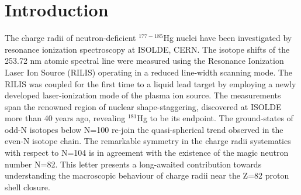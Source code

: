 \section{Introduction}
The charge radii of neutron-deficient $^{177-185}$Hg nuclei have been investigated by resonance ionization spectroscopy at ISOLDE, CERN.  The isotope shifts of the 253.72 nm atomic spectral line were measured using the Resonance Ionization Laser Ion Source (RILIS) operating in a reduced line-width scanning mode.  The RILIS was coupled for the first time to a liquid lead target by employing a newly developed laser-ionization mode of the plasma ion source. The measurements span the renowned region of nuclear shape-staggering, discovered at ISOLDE more than 40 years ago, revealing $^{181}$Hg to be its endpoint. The ground-states of odd-N isotopes below N=100 re-join the quasi-spherical trend observed in the even-N isotope chain.  The remarkable symmetry in the charge radii systematics with respect to N=104 is in agreement with the existence of the magic neutron number N=82. This letter presents a long-awaited contribution towards understanding the macroscopic behaviour of charge radii near the Z=82 proton shell closure.